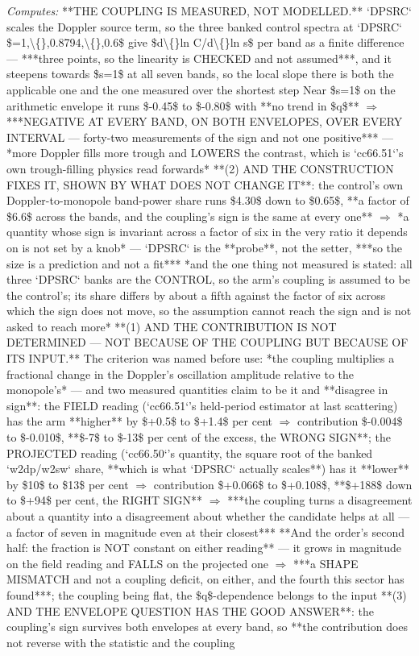 \begin{description}
\emph{Computes:}  **THE COUPLING IS MEASURED, NOT MODELLED.** `DPSRC` scales the Doppler source term, so the three banked control spectra at `DPSRC` \$=1,\textbackslash\{\},0.8794,\textbackslash\{\},0.6\$ give \$d\textbackslash\{\}ln C/d\textbackslash\{\}ln s\$ per band as a finite difference --- ***three points, so the linearity is CHECKED and not assumed***, and it steepens towards \$s=1\$ at all seven bands, so the local slope there is both the applicable one and the one measured over the shortest step  Near \$s=1\$ on the arithmetic envelope it runs \$-0.45\$ to \$-0.80\$ with **no trend in \$q\$** \ensuremath{\Rightarrow} ***NEGATIVE AT EVERY BAND, ON BOTH ENVELOPES, OVER EVERY INTERVAL --- forty-two measurements of the sign and not one positive*** --- *more Doppler fills more trough and LOWERS the contrast, which is `cc66.51`'s own trough-filling physics read forwards*   **(2) AND THE CONSTRUCTION FIXES IT, SHOWN BY WHAT DOES NOT CHANGE IT**: the control's own Doppler-to-monopole band-power share runs \$4.30\$ down to \$0.65\$, **a factor of \$6.6\$ across the bands, and the coupling's sign is the same at every one** \ensuremath{\Rightarrow} *a quantity whose sign is invariant across a factor of six in the very ratio it depends on is not set by a knob* --- `DPSRC` is the **probe**, not the setter, ***so the size is a prediction and not a fit***  *and the one thing not measured is stated: all three `DPSRC` banks are the CONTROL, so the arm's coupling is assumed to be the control's; its share differs by about a fifth against the factor of six across which the sign does not move, so the assumption cannot reach the sign and is not asked to reach more*   **(1) AND THE CONTRIBUTION IS NOT DETERMINED --- NOT BECAUSE OF THE COUPLING BUT BECAUSE OF ITS INPUT.** The criterion was named before use: *the coupling multiplies a fractional change in the Doppler's oscillation amplitude relative to the monopole's* --- and two measured quantities claim to be it and **disagree in sign**: the FIELD reading (`cc66.51`'s held-period estimator at last scattering) has the arm **higher** by \$+0.5\$ to \$+1.4\$ per cent \ensuremath{\Rightarrow} contribution \$-0.004\$ to \$-0.010\$, **\$-7\$ to \$-13\$ per cent of the excess, the WRONG SIGN**; the PROJECTED reading (`cc66.50`'s quantity, the square root of the banked `w2dp/w2sw` share, **which is what `DPSRC` actually scales**) has it **lower** by \$10\$ to \$13\$ per cent \ensuremath{\Rightarrow} contribution \$+0.066\$ to \$+0.108\$, **\$+188\$ down to \$+94\$ per cent, the RIGHT SIGN** \ensuremath{\Rightarrow} ***the coupling turns a disagreement about a quantity into a disagreement about whether the candidate helps at all --- a factor of seven in magnitude even at their closest***  **And the order's second half: the fraction is NOT constant on either reading** --- it grows in magnitude on the field reading and FALLS on the projected one \ensuremath{\Rightarrow} ***a SHAPE MISMATCH and not a coupling deficit, on either, and the fourth this sector has found***; the coupling being flat, the \$q\$-dependence belongs to the input   **(3) AND THE ENVELOPE QUESTION HAS THE GOOD ANSWER**: the coupling's sign survives both envelopes at every band, so **the contribution does not reverse with the statistic and the coupling 
\end{description}
